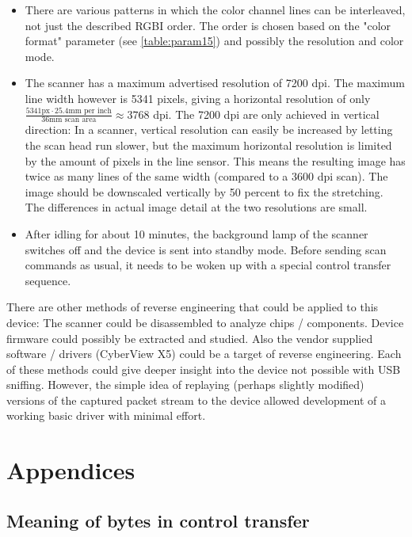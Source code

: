 \documentclass{article}
\begin{document}
\begin{itemize}
\item There are various patterns in which the color channel lines can be interleaved,
not just the described RGBI order. The order is chosen based on the "color format" parameter
(see \autoref{table:param15}) and possibly the resolution and color mode.

\item
The scanner has a maximum advertised resolution of 7200 dpi. The maximum line width
however is 5341 pixels, giving a horizontal resolution of only
$\frac{5341 \text{px} \cdot 25.4 \text{mm per inch}}{36 \text{mm scan area}} \approx 3768$
dpi. The 7200 dpi are only achieved in vertical direction: In a scanner,
vertical resolution can easily be increased by letting the scan head run slower, but
the maximum horizontal resolution is limited by the amount of pixels in the line sensor.
This means the resulting image has twice as many lines of the same width (compared to a 3600 dpi scan).
The image should be downscaled vertically by 50 percent to fix the stretching. The differences
in actual image detail at the two resolutions are small.

\item
After idling for about 10 minutes, the background lamp of the scanner switches off and the
device is sent into standby mode. Before sending scan commands as usual, it needs to be
woken up with a special control transfer sequence.
\end{itemize}

There are other methods of reverse engineering that could be applied to this device:
The scanner could be disassembled to analyze chips / components. Device firmware could
possibly be extracted and studied. Also the vendor supplied software / drivers (CyberView X5)
could be a target of reverse engineering. Each of these methods could give deeper insight
into the device not possible with USB sniffing. However, the simple idea of replaying
(perhaps slightly modified) versions of the captured packet stream to the device
allowed development of a working basic driver with minimal effort.

\appendix
\section*{Appendices}
\renewcommand{\thesubsection}{\Alph{subsection}}


\subsection{Meaning of bytes in control transfer}
\label{appendix_meaning}
\end{document}
